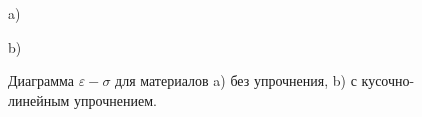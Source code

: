 \begin{figure}[h!]
\begin{minipage}{0.47\linewidth}
 a)
\end{minipage}
\begin{minipage}{0.47\linewidth}
 b)
\end{minipage}
\caption{Диаграмма $\varepsilon - \sigma$ для материалов a) без упрочнения, b) с кусочно-линейным упрочнением.}
\label{pic:eps-sigma}
\end{figure} 


